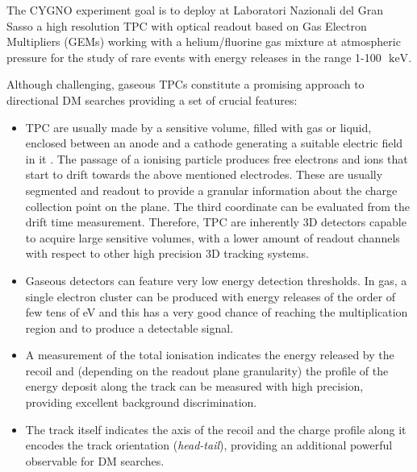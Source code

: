 \documentclass[physics,article,submit,moreauthors,pdftex]{Definitions/mdpi}
\newcommand{\keV}{\ensuremath{\,\textrm{keV}}\xspace}
\begin{document}
The CYGNO experiment goal is to deploy at Laboratori Nazionali del Gran Sasso a high resolution TPC with optical readout based on Gas Electron Multipliers (GEMs) working with a helium/fluorine gas mixture at atmospheric pressure for the study of rare events with energy releases in the range 1-100~\keV.

Although challenging, gaseous TPCs constitute a promising approach to directional DM searches providing a set of crucial features:
\begin{itemize}

\item TPC are usually made by a sensitive volume, filled with gas or liquid, enclosed between an anode and a cathode generating a suitable electric field in it \cite{bib:tpc1, bib:tpc2, bib:tpc3}. The passage of a ionising particle produces free electrons and ions that start to drift towards the above mentioned electrodes. These are usually segmented and readout to provide a granular information about the charge collection point on the plane. The third coordinate can be evaluated from the drift time measurement.
Therefore, TPC are inherently 3D detectors capable to acquire large sensitive volumes, with a lower amount of readout channels with respect to other high precision 3D tracking systems.

\item Gaseous detectors can feature very low energy detection thresholds. In gas, a single electron cluster can be produced with energy releases of the order of few tens of eV and this has a very good chance of reaching the multiplication region and to produce a detectable signal.

\item A measurement of the  total ionisation indicates the energy released by the recoil and (depending on the readout plane granularity) the profile of the energy deposit along the track can be measured with high precision, providing excellent background discrimination.

\item The track itself indicates the axis of the recoil and the charge profile along it encodes the track orientation ({\it head-tail}), providing an additional powerful observable for DM searches. 


\end{itemize}
\end{document}
